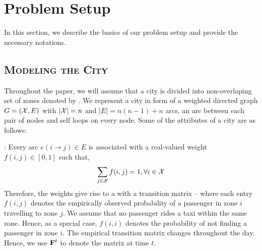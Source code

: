 
\section{Problem Setup}
\label{sec:problem_setup}

In this section, we describe the basics of our problem setup and provide the necessary notations.



\subsection{\textsc{Modeling the City}}

Throughout the paper, we will assume that a city is divided into non-overlaping set of zones denoted by \cityzones. 
We represent a city in form of a weighted directed graph $G=(\mathcal{X}, E)$ with 
$|\mathcal{X}| = n$ and $|E| = n(n-1) + n$ arcs, an arc between each pair of nodes and self loops on every node. 
Some of the attributes of a city are as follows:


:
Every arc $e(i\rightarrow j) \in E$ is associated with a real-valued weight $f(i,j) \in [0,1]$ such that,
\begin{equation}
	\sum_{j \in \mathcal{X}} f(i,j) = 1, \forall i \in \mathcal{X}
\end{equation}
Therefore, the weights give rise to a {\markovchain} with a transition matrix {\empiricaltransitionmatrix} -- 
where each entry $f(i,j)$ 
denotes the empirically observed probability of a passenger in zone $i$
travelling to zone $j$. We assume that no passenger rides a taxi within the same zone. Hence, as a special case, 
$f(i,i)$ denotes the probability of not finding a passenger in zone $i$. The empirical transition matrix {\empiricaltransitionmatrix}
changes throughout the day. Hence, we use ${\mathbf{F}}^t$ to denote the matrix at time $t$.


